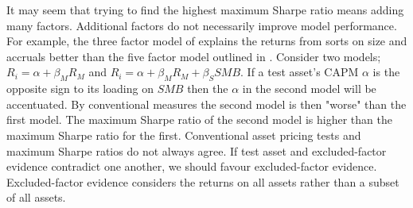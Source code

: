 It may seem that trying to find the highest maximum Sharpe ratio means adding many factors.
Additional factors do not necessarily improve model performance.
For example, the three factor model of \textcite{fama1993common} explains the returns from 
sorts on size and accruals better than the five factor model outlined in 
\textcite{fama2015five}.
Consider two models; $R_i=\alpha+\beta_MR_M$ and $R_i=\alpha+\beta_MR_M+\beta_SSMB$.
If a test asset's CAPM $\alpha$ is the opposite sign to its loading on $SMB$ 
then the $\alpha$ in the second model will be accentuated.
By conventional measures the second model is then "worse" than the first model.
The maximum Sharpe ratio of the second model is higher than the maximum Sharpe 
ratio for the first.
Conventional asset pricing tests and maximum Sharpe ratios do not always agree.
If test asset and excluded-factor evidence contradict one another, we should favour 
excluded-factor evidence.
Excluded-factor evidence considers the returns on all assets rather than a subset of all 
assets.
